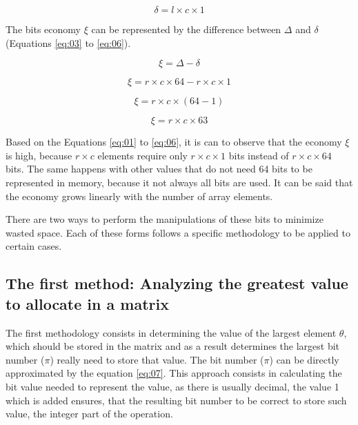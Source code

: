 \documentclass[10pt]{article}
\begin{document}
\begin{equation}\label{eq:02}
  \delta = l \times c \times 1
\end{equation}

The bits economy $\xi$ can be represented by the difference between $\Delta$ and $\delta$ (Equations \ref{eq:03} to \ref{eq:06}).

\begin{equation}\label{eq:03}
 \xi = \Delta - \delta
\end{equation}

\begin{equation}\label{eq:04}
 \xi =  r \times c \times 64 - r \times c \times 1
\end{equation}

\begin{equation}\label{eq:05}
 \xi =  r \times c \times (64 -  1)
\end{equation}

\begin{equation} \label{eq:06}
 \xi =  r \times c \times 63
\end{equation}

Based on the Equations \ref{eq:01} to \ref{eq:06}, it is can to observe that the economy $\xi$ is high, because $r \times c$ elements require only $r \times c \times  1$ bits instead of $r \times c \times 64$ bits. The same happens with other values ​​that do not need 64 bits to be represented in memory, because it not always all bits are used. It can be said that the economy grows linearly with the number of array elements.

There are two ways to perform the manipulations of these bits to minimize wasted space. Each of these forms follows a specific methodology to be applied to certain cases. 

\subsection*{The first method: Analyzing the greatest value to allocate in a matrix}

The first methodology consists in determining the value of the largest element $\theta$, which should be stored in the matrix and as a result determines the  largest bit number ($\pi$) really need to store that value. The bit number ($\pi$) can be directly approximated by the equation \ref{eq:07}. This approach consists in calculating the bit value needed to represent the value, as there is usually decimal, the value 1 which is added ensures, that the resulting bit number to be correct to store such value, the integer part of the operation.
\end{document}
